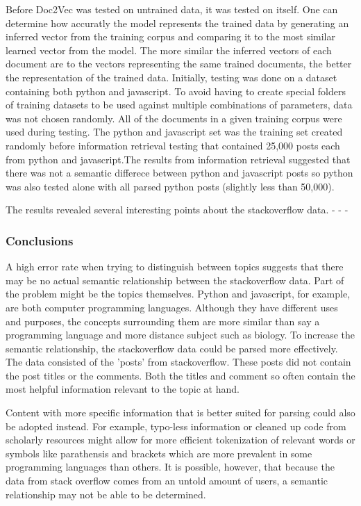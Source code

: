 Before Doc2Vec was tested on untrained data, it was tested on itself. One can determine how accuratly the model represents the trained data by generating an inferred vector from the training corpus and comparing it to the most similar learned vector from the model. The more similar the inferred vectors of each document are to the vectors representing the same trained documents, the better the representation of the trained data. Initially, testing was done on a dataset containing both python and javascript. To avoid having to create special folders of training datasets to be used against multiple combinations of parameters, data was not chosen randomly. All of the documents in a given training corpus were used during testing. The python and javascript set was the training set created randomly before information retrieval testing that contained 25,000 posts each from python and javascript.The results from information retrieval suggested that there was not a semantic differece between python and javascript posts so python was also tested alone with all parsed python posts (slightly less than 50,000). 

The results revealed several interesting points about the stackoverflow data. 
-
-
-


\subsubsection{Conclusions}
A high error rate when trying to distinguish between topics suggests that there may be no actual semantic relationship between the stackoverflow data. Part of the problem might be the topics themselves. Python and javascript, for example, are both computer programming languages. Although they have different uses and purposes, the concepts surrounding them are more similar than say a programming language and more distance subject such as biology. To increase the semantic relationship, the stackoverflow data could be parsed more effectively. The data consisted of the 'posts' from stackoverflow. These posts did not contain the post titles or the comments. Both the titles and comment so often contain the most helpful information relevant to the topic at hand. 

Content with more specific information that is better suited for parsing could also be adopted instead. For example, typo-less information or cleaned up code from scholarly resources might allow for more efficient tokenization of relevant words or symbols like parathensis and brackets which are more prevalent in some programming languages than others. It is possible, however, that because the data from stack overflow comes from an untold amount of users, a semantic relationship may not be able to be determined. 

